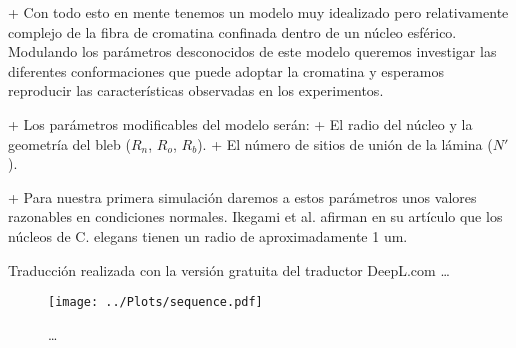 + Con todo esto en mente tenemos un modelo muy idealizado pero relativamente complejo de la fibra de cromatina confinada dentro de un núcleo esférico. Modulando los parámetros desconocidos de este modelo queremos investigar las diferentes conformaciones que puede adoptar la cromatina y esperamos reproducir las características observadas en los experimentos.

+ Los parámetros modificables del modelo serán:
+ El radio del núcleo y la geometría del bleb ($R_n$, $R_o$, $R_b$).
+ El número de sitios de unión de la lámina ($N'$).

+ Para nuestra primera simulación daremos a estos parámetros unos valores razonables en condiciones normales. Ikegami et al. afirman en su artículo que los núcleos de C. elegans tienen un radio de aproximadamente 1 $\text{um}$.

Traducción realizada con la versión gratuita del traductor DeepL.com
\cite{Ho2014}\dots

\begin{figure}
    \centering
    \texttt{[image: ../Plots/sequence.pdf]}
    \caption{\dots}
    \label{fig:sequence}
\end{figure}
